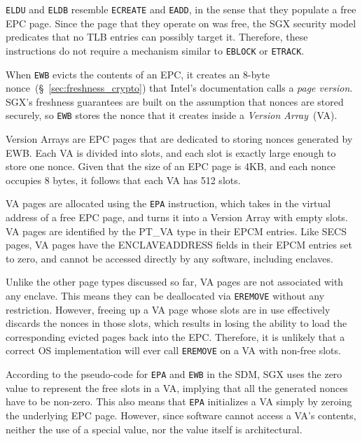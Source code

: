\texttt{ELDU} and \texttt{ELDB} resemble \texttt{ECREATE} and \texttt{EADD},
in the sense that they populate a free EPC page. Since the page that they
operate on was free, the SGX security model predicates that no TLB entries can
possibly target it. Therefore, these instructions do not require a mechanism
similar to \texttt{EBLOCK} or \texttt{ETRACK}.


\label{sec:sgx_va}
\label{sec:sgx_epa}


When \texttt{EWB} evicts the contents of an EPC, it creates an 8-byte
nonce~(\S~\ref{sec:freshness_crypto}) that Intel's documentation calls a
\textit{page version}. SGX's freshness guarantees are built on the assumption
that nonces are stored securely, so \texttt{EWB} stores the nonce that it
creates inside a \textit{Version Array}~(VA).

Version Arrays are EPC pages that are dedicated to storing nonces generated by
EWB. Each VA is divided into slots, and each slot is exactly large enough to
store one nonce. Given that the size of an EPC page is 4KB, and each nonce
occupies 8 bytes, it follows that each VA has 512 slots.


VA pages are allocated using the \texttt{EPA} instruction, which takes in the
virtual address of a free EPC page, and turns it into a Version Array with
empty slots. VA pages are identified by the PT\_VA type in their EPCM entries.
Like SECS pages, VA pages have the ENCLAVEADDRESS fields in their EPCM entries
set to zero, and cannot be accessed directly by any software, including
enclaves.


Unlike the other page types discussed so far, VA pages are not associated with
any enclave. This means they can be deallocated via \texttt{EREMOVE} without
any restriction. However, freeing up a VA page whose slots are in use
effectively discards the nonces in those slots, which results in losing the
ability to load the corresponding evicted pages back into the EPC. Therefore,
it is unlikely that a correct OS implementation will ever call \texttt{EREMOVE}
on a VA with non-free slots.


According to the pseudo-code for \texttt{EPA} and \texttt{EWB} in the SDM, SGX
uses the zero value to represent the free slots in a VA, implying that all the
generated nonces have to be non-zero. This also means that \texttt{EPA}
initializes a VA simply by zeroing the underlying EPC page. However, since
software cannot access a VA's contents, neither the use of a special value, nor
the value itself is architectural.


